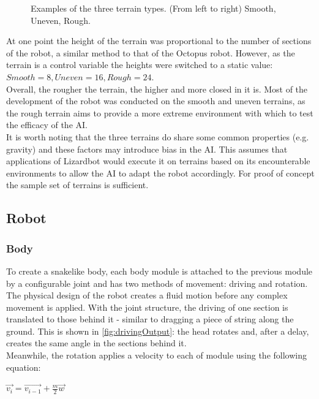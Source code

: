 \documentclass{article}
\begin{document}
\begin{figure}[H]
\caption{Examples of the three terrain types. (From left to right) Smooth, Uneven, Rough.}
\end{figure}
At one point the height of the terrain was proportional to the number of sections of the robot, a similar method to that of the Octopus robot.  However, as the terrain is a control variable the heights were switched to a static value: $Smooth=8, Uneven=16, Rough=24$.\\
Overall, the rougher the terrain, the higher and more closed in it is. Most of the development of the robot was conducted on the smooth and uneven terrains, as the rough terrain aims to provide a more extreme environment with which to test the efficacy of the AI.\\
It is worth noting that the three terrains do share some common properties (e.g. gravity) and these factors may introduce bias in the AI. This assumes that applications of Lizardbot would  execute it on terrains based on its encounterable environments to allow the AI to adapt the robot accordingly. For proof of concept the sample set of terrains is sufficient.

\subsection{Robot}
\label{sec:Robot Imp}
\subsubsection{Body}
\label{sec:Body Imp}
To create a snakelike body, each body module is attached to the previous module by a configurable joint  and has two methods of movement: driving and rotation. The physical design of the robot creates a fluid motion before any complex movement is applied. With the joint structure, the driving of one section is translated to those behind it - similar to dragging a piece of string along the ground. This is shown in \autoref{fig:drivingOutput}: the head rotates and, after a delay, creates the same angle in the sections behind it.\\

Meanwhile, the rotation applies a velocity to each of module using the following equation:
\begin{center}
\begin{Large}
$\overrightarrow{v_{i}} = \overrightarrow{v_{i-1}} + \frac{m}{2}\overrightarrow{w} $
\end{Large}
\end{center}
\end{document}

